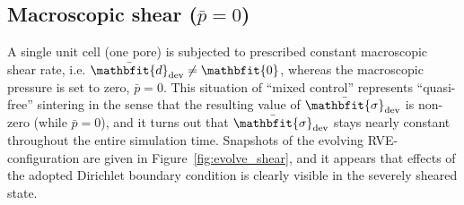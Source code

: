 \documentclass[12pt,review]{elsarticle}
\renewcommand{\ts}[1]{\mathbfit{#1}}
\newcommand{\figref}[1]{Figure~\ref{#1}}
\begin{document}
\subsection*{Macroscopic shear ($\bar{p} = 0$)}


A single unit cell (one pore) is subjected to prescribed constant macroscopic shear rate, i.e. $\bar{\ts d}_\dev\neq \ts 0$, whereas the macroscopic pressure is set to zero, $\bar{p}=0$.
This situation of ``mixed control'' represents ``quasi-free'' sintering in the sense that the resulting value of $\bar{\ts\sigma}_\dev$ is non-zero (while $\bar p = 0 $), and it turns out that $\bar{\ts\sigma}_\dev$ stays nearly constant throughout the entire simulation time.
Snapshots of the evolving RVE-configuration are given in \figref{fig:evolve_shear}, and it appears that effects of the adopted Dirichlet boundary condition is clearly visible in the severely sheared state.
\end{document}
